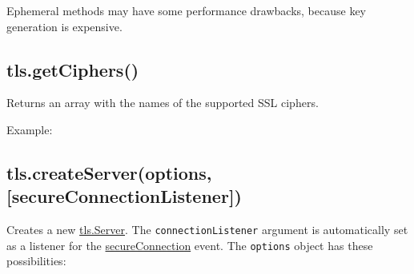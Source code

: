 Ephemeral methods may have some performance drawbacks, because key
generation is expensive.

\subsection{tls.getCiphers()}\label{tls.getciphers}

Returns an array with the names of the supported SSL ciphers.

Example:

\begin{Shaded}
\begin{Highlighting}[]
 \NormalTok{();}
\end{Highlighting}
\end{Shaded}

\subsection{tls.createServer(options,
{[}secureConnectionListener{]})}\label{tls.createserveroptions-secureconnectionlistener}

Creates a new \hyperref[tlsux5fclassux5ftlsux5fserver]{tls.Server}. The
\texttt{connectionListener} argument is automatically set as a listener
for the \hyperref[tlsux5feventux5fsecureconnection]{secureConnection}
event. The \texttt{options} object has these possibilities:


